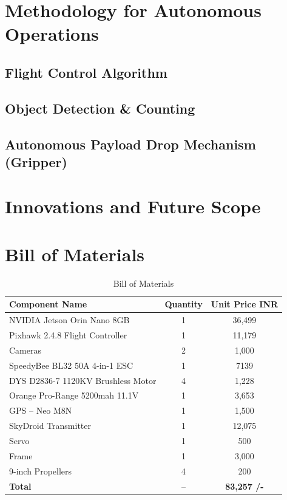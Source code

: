 \documentclass[12pt]{report}
\begin{document}
  \chapter{Methodology for Autonomous Operations}
    \section{Flight Control Algorithm}
    \section{Object Detection \& Counting}
    \section{Autonomous Payload Drop Mechanism (Gripper)}

  \chapter{Innovations and Future Scope}
  \chapter{Bill of Materials}
    \begin{table}[h!]
      \centering
      \caption{Bill of Materials} \vspace{0.2cm}
        \begin{tabular}{|l|c|c|}
          \hline
          \textbf{Component Name} & \textbf{Quantity} & \textbf{Unit Price {INR}} \\
          \hline
          NVIDIA Jetson Orin Nano 8GB & 1 & 36,499 \\
          Pixhawk 2.4.8 Flight Controller & 1 & 11,179 \\
          Cameras & 2 & 1,000 \\
          SpeedyBee BL32 50A 4-in-1 ESC &1 &7139\\
          DYS D2836-7 1120KV Brushless Motor &4 &1,228\\
          Orange Pro-Range 5200mah 11.1V & 1 &3,653\\
          GPS – Neo M8N  &1 &1,500\\
          SkyDroid Transmitter  &1 & 12,075\\
          Servo & 1& 500\\
          Frame  &1& 3,000\\
          9-inch Propellers & 4 &200\\
          \hline
          \textbf{Total}  & --  & \textbf{83,257 /-}   \\      
          \hline
        \end{tabular}
    \end{table}
\end{document}

